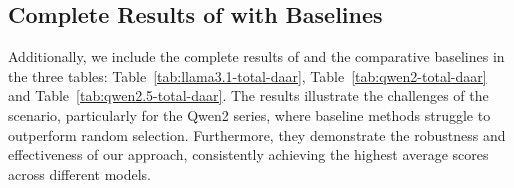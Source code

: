 \newpage
\subsection{Complete Results of \ours with Baselines}
\label{sec:appendix-total-daar}
Additionally, we include the complete results of \ours and the comparative baselines in the three tables: Table~\ref{tab:llama3.1-total-daar}, Table~\ref{tab:qwen2-total-daar} and Table~\ref{tab:qwen2.5-total-daar}. The results illustrate the challenges of the scenario, particularly for the Qwen2 series, where baseline methods struggle to outperform random selection. Furthermore, they demonstrate the robustness and effectiveness of our approach, consistently achieving the highest average scores across different models.

\begin{table}[h]
\centering
\caption{Performance of \ours with baselines on Llama3.1-8B across various benchmarks.}
\label{tab:llama3.1-total-daar}
\end{table}

